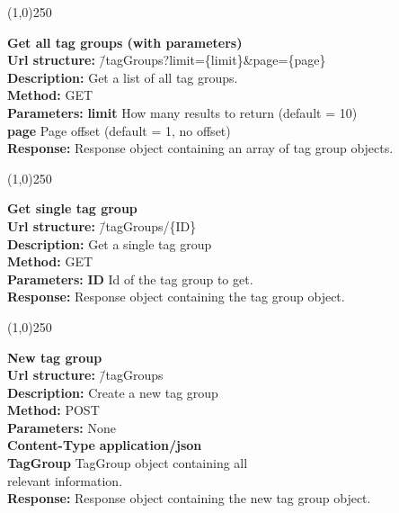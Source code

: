 \documentclass[11pt]{article}
\begin{document}
\begin{center}\line(1,0){250}\end{center}

\begin{tabbing}
\textbf{Get all tag groups (with parameters)} \\
\textcolor{black!60}{\textbf{Url structure:}} \hspace{0.2in} \= /tagGroups?limit=\{limit\}\&page=\{page\} \\
\textcolor{black!60}{\textbf{Description:}}  \> Get a list of all tag groups. \\
\textcolor{black!60}{\textbf{Method:}} \> GET \\
\textcolor{black!60}{\textbf{Parameters:}} \> \textbf{limit} How many results to return (default = 10) \\
\> \textbf{page} Page offset (default = 1, no offset) \\
\textcolor{black!60}{\textbf{Response:}} \> Response object containing an array of tag group objects.
\end{tabbing}

\begin{center}\line(1,0){250}\end{center}

\begin{tabbing}
\textbf{Get single tag group} \\
\textcolor{black!60}{\textbf{Url structure:}} \hspace{0.2in} \= /tagGroups/\{ID\} \\
\textcolor{black!60}{\textbf{Description:}}  \> Get a single tag group \\
\textcolor{black!60}{\textbf{Method:}} \> GET \\
\textcolor{black!60}{\textbf{Parameters:}} \> \textbf{ID} Id of the tag group to get. \\
\textcolor{black!60}{\textbf{Response:}} \> Response object containing the tag group object.
\end{tabbing}

\begin{center}\line(1,0){250}\end{center}

\begin{tabbing}
\textbf{New tag group} \\
\textcolor{black!60}{\textbf{Url structure:}} \hspace{0.2in} \= /tagGroups \\
\textcolor{black!60}{\textbf{Description:}}  \> Create a new tag group \\
\textcolor{black!60}{\textbf{Method:}} \> POST \\
\textcolor{black!60}{\textbf{Parameters:}} \> None \\
\textcolor{black!60}{\textbf{Content-Type}} \> \textbf{application/json} \\
\> \textbf{TagGroup} TagGroup object containing all 
\\ \> relevant information.\\
\textcolor{black!60}{\textbf{Response:}} \> Response object containing the new tag group object.
\end{tabbing}
\end{document}
